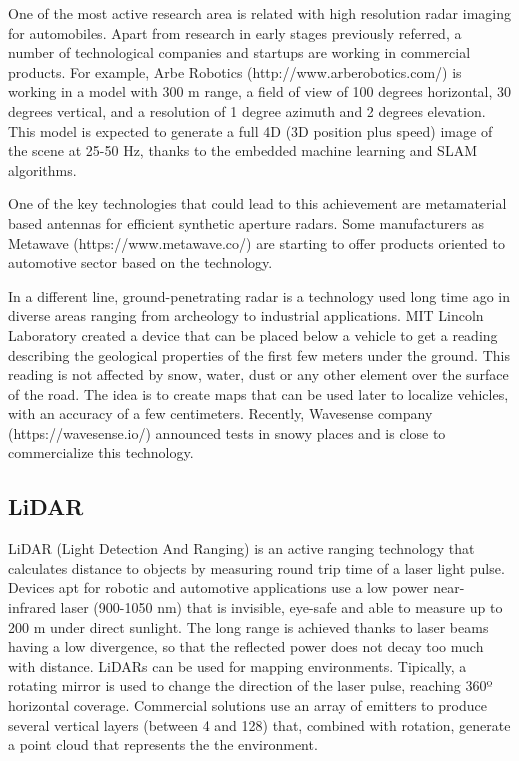 One of the most active research area is related with high resolution radar
imaging for automobiles. Apart from research in early stages previously 
referred, a number of technological companies and startups are working in 
commercial products. 
For example, Arbe Robotics (http://www.arberobotics.com/) is working in a 
model with 300 m range, a field of view of 100 degrees horizontal, 30 degrees
vertical, and a resolution of 1 degree azimuth and 2 degrees elevation. 
This model is expected to generate a full 4D (3D position plus speed) image of
the scene at 25-50 Hz, thanks to the embedded machine learning and SLAM
algorithms.

One of the key technologies that could lead to this achievement are metamaterial
based antennas \cite{Brookner2016,Sleasman2017} for efficient synthetic aperture
radars. Some manufacturers as Metawave (https://www.metawave.co/) are starting 
to offer products oriented to automotive sector based on the technology.

In a different line, ground-penetrating radar is a technology used long
time ago in diverse areas ranging from archeology to industrial applications.
MIT Lincoln Laboratory created a device \cite{Cornick2016} that can be placed 
below a vehicle to get a reading describing the geological properties of the
first few meters under the ground. This reading is not affected by snow, 
water, dust or any other element over the surface of the road. The idea is to
create maps that can be used later to localize vehicles, with an accuracy of
a few centimeters. \cite{XXXX}
Recently, Wavesense company (https://wavesense.io/) announced tests in snowy
places and is close to commercialize this technology.



\subsection{LiDAR}
LiDAR (Light Detection And Ranging) is an active ranging technology that calculates distance to objects by measuring round trip time of a laser light pulse.
Devices apt for robotic and automotive applications use a low power 
near-infrared laser (900-1050 nm) that is invisible, eye-safe and able to 
measure up to 200 m under direct sunlight. The long range is achieved thanks to
laser beams having a low divergence, so that the reflected power does not decay
too much with distance.
LiDARs can be used for mapping environments. Tipically, a rotating mirror is used to change the direction of the laser pulse, reaching 360º horizontal coverage. Commercial solutions use an array of emitters to produce several vertical layers (between 4 and 128) that, combined with rotation, generate a point cloud that represents the the environment.

